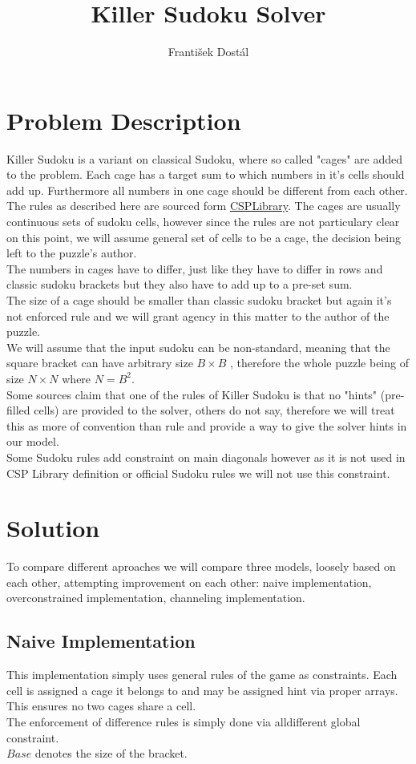 \documentclass[10pt,a4paper,oneside]{article}
\author{František Dostál}
\title{Killer Sudoku Solver}
\begin{document}
\maketitle
\section{Problem Description}
Killer Sudoku is a variant on classical Sudoku, where so called "cages" are added to the problem. Each cage has a target sum to which numbers in it's cells should add up. Furthermore all numbers in one cage should be different from each other. The rules as described here are sourced form \href{https://www.csplib.org/Problems/prob057/}{CSPLibrary}.
The cages are usually continuous sets of sudoku cells, however since the rules are not particulary clear on this point, we will assume general set of cells to be a cage, the decision being left to the puzzle's author.\\
The numbers in cages have to differ, just like they have to differ in rows and classic sudoku brackets but they also have to add up to a pre-set sum.\\
The size of a cage should be smaller than classic sudoku bracket but again it's not enforced rule and we will grant agency in this matter to the author of the puzzle.\\
We will assume that the input sudoku can be non-standard, meaning that the square bracket can have arbitrary size $ B\times B$ , therefore the whole puzzle being of size $ N\times N$ where $ N = B^{2} $.\\
Some sources claim that one of the rules of Killer Sudoku is that no "hints" (pre-filled cells) are provided to the solver, others do not say, therefore we will treat this as more of convention than rule and provide a way to give the solver hints in our model.\\
Some Sudoku rules add constraint on main diagonals however as it is not used in CSP Library definition or official Sudoku rules we will not use this constraint. \\
\section{Solution}
To compare different aproaches we will compare three models, loosely based on each other, attempting improvement on each other: naive implementation, overconstrained implementation, channeling implementation. 
\subsection{Naive Implementation}
This implementation simply uses general rules of the game as constraints. Each cell is assigned a cage it belongs to and may be assigned hint via proper arrays. This ensures no two cages share a cell.\\
The enforcement of difference rules is simply done via alldifferent global constraint.\\
$ Base $ denotes the size of the bracket.
\end{document}
